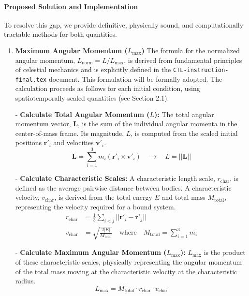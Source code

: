 \documentclass[11pt, a4paper]{article}
\begin{document}
\paragraph{Proposed Solution and Implementation}
To resolve this gap, we provide definitive, physically sound, and computationally tractable methods for both quantities.

\begin{enumerate}
    \item \textbf{Maximum Angular Momentum ($L_{\max}$)}
    The formula for the normalized angular momentum, $L_{\text{norm}} = L/L_{\max}$, is derived from fundamental principles of celestial mechanics and is explicitly defined in the \texttt{CTL-instruction-final.tex} document. This formulation will be formally adopted. The calculation proceeds as follows for each initial condition, using spatiotemporally scaled quantities (see Section 2.1):
    
        
- \textbf{Calculate Total Angular Momentum ($L$):} The total angular momentum vector, $\mathbf{L}$, is the sum of the individual angular momenta in the center-of-mass frame. Its magnitude, $L$, is computed from the scaled initial positions $\mathbf{r}'_i$ and velocities $\mathbf{v}'_i$.
        \begin{equation}
            \mathbf{L} = \sum_{i=1}^{3} m_i (\mathbf{r}'_i \times \mathbf{v}'_i) \quad \rightarrow \quad L = ||\mathbf{L}||
        \end{equation}
        
- \textbf{Calculate Characteristic Scales:} A characteristic length scale, $r_{\text{char}}$, is defined as the average pairwise distance between bodies. A characteristic velocity, $v_{\text{char}}$, is derived from the total energy $E$ and total mass $M_{\text{total}}$, representing the velocity required for a bound system.
        \begin{align}
            r_{\text{char}} &= \frac{1}{3} \sum_{i<j} ||\mathbf{r}'_i - \mathbf{r}'_j|| \\
            v_{\text{char}} &= \sqrt{\frac{2|E|}{M_{\text{total}}}} \quad \text{where} \quad M_{\text{total}} = \sum_{i=1}^{3} m_i
        \end{align}
        
- \textbf{Calculate Maximum Angular Momentum ($L_{\max}$):} $L_{\max}$ is the product of these characteristic scales, physically representing the angular momentum of the total mass moving at the characteristic velocity at the characteristic radius.
        \begin{equation}
            L_{\max} = M_{\text{total}} \cdot r_{\text{char}} \cdot v_{\text{char}}
        \end{equation}
        

\end{enumerate}
\end{document}
